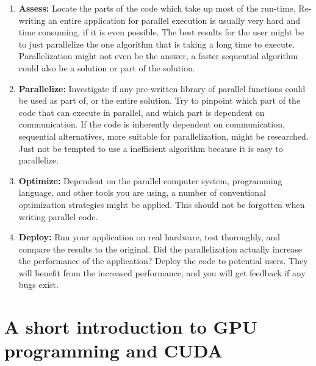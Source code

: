 \begin{enumerate}
    \item \textbf{Assess:} Locate the parts of the code which take up most of the run-time. Re-writing an entire application for parallel execution is usually very hard and time consuming, if it is even possible. The best results for the user might be to just parallelize the one algorithm that is taking a long time to execute. Parallelization might not even be the answer, a faster sequential algorithm could also be a solution or part of the solution.

    \item \textbf{Parallelize:} Investigate if any pre-written library of parallel functions could be used as part of, or the entire solution. Try to pinpoint which part of the code that can execute in parallel, and which part is dependent on communication. If the code is inherently dependent on communication, sequential alternatives, more suitable for parallelization, might be researched. Just not be tempted to use a inefficient algorithm because it is easy to parallelize.

    \item \textbf{Optimize:} Dependent on the parallel computer system, programming language, and other tools you are using, a number of conventional optimization strategies might be applied. This should not be forgotten when writing parallel code.

    \item \textbf{Deploy:} Run your application on real hardware, test thoroughly, and compare the results to the original. Did the parallelization actually increase the performance of the application? Deploy the code to potential users. They will benefit from the increased performance, and you will get feedback if any bugs exist.
\end{enumerate}



\section{A short introduction to GPU programming and CUDA} %
\label{sub:a_short_introduction_to_gpu_programming_and_cuda}

